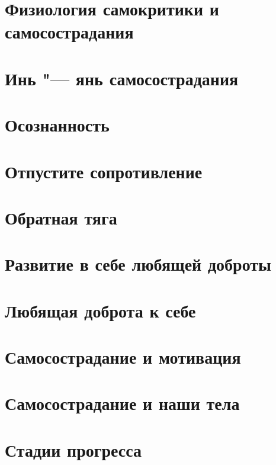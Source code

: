 \documentclass[a4paper,12pt]{article}
\begin{document}



\tableofcontents








\section{Физиология самокритики и самосострадания}
\section{Инь "--- янь самосострадания }
\section{Осознанность}
\section{Отпустите сопротивление}
\section{Обратная тяга}
\section{Развитие в себе любящей доброты}
\section{Любящая доброта к себе}
\section{Самосострадание и мотивация} \label{Self-Compassionate_Motivation}
\section{Самосострадание и наши тела}
\section{Стадии прогресса}
\end{document}
